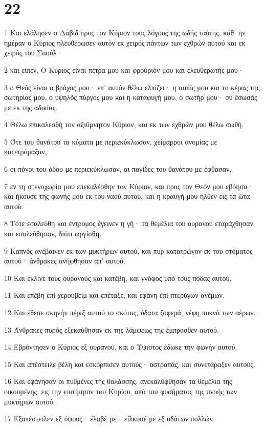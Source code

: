 \chapter{22}

\par 1 Και ελάλησεν ο Δαβίδ προς τον Κύριον τους λόγους της ωδής ταύτης, καθ' ην ημέραν ο Κύριος ηλευθέρωσεν αυτόν εκ χειρός πάντων των εχθρών αυτού και εκ χειρός του Σαούλ·
\par 2 και είπεν, Ο Κύριος είναι πέτρα μου και φρούριόν μου και ελευθερωτής μου·
\par 3 ο Θεός είναι ο βράχος μου· επ' αυτόν θέλω ελπίζει· η ασπίς μου και το κέρας της σωτηρίας μου, ο υψηλός πύργος μου και η καταφυγή μου, ο σωτήρ μου· συ έσωσάς με εκ της αδικίας.
\par 4 Θέλω επικαλεσθή τον αξιΰμνητον Κύριον, και εκ των εχθρών μου θέλω σωθή.
\par 5 Ότε του θανάτου τα κύματα με περιεκύκλωσαν, χείμαρροι ανομίας με κατετρόμαξαν,
\par 6 οι πόνοι του άδου με περιεκύκλωσαν, αι παγίδες του θανάτου με έφθασαν,
\par 7 εν τη στενοχωρία μου επεκαλέσθην τον Κύριον, και προς τον Θεόν μου εβόησα· και ήκουσε της φωνής μου εκ του ναού αυτού, και η κραυγή μου ήλθεν εις τα ώτα αυτού.
\par 8 Τότε εσαλεύθη και έντρομος έγεινεν η γή· τα θεμέλια του ουρανού εταράχθησαν και εσαλεύθησαν, διότι ωργίσθη.
\par 9 Καπνός ανέβαινεν εκ των μυκτήρων αυτού, και πυρ κατατρώγον εκ του στόματος αυτού· άνθρακες ανήφθησαν απ' αυτού.
\par 10 Και έκλινε τους ουρανούς και κατέβη, και γνόφος υπό τους πόδας αυτού.
\par 11 Και επέβη επί χερουβείμ και επέταξε, και εφάνη επί πτερύγων ανέμων.
\par 12 Και έθεσε σκηνήν πέριξ αυτού το σκότος, ύδατα ζοφερά, νέφη πυκνά των αέρων.
\par 13 Άνθρακες πυρός εξεκαύθησαν εκ της λάμψεως της έμπροσθεν αυτού.
\par 14 Εβρόντησεν ο Κύριος εξ ουρανού, και ο Ύψιστος έδωκε την φωνήν αυτού.
\par 15 Και απέστειλε βέλη και εσκόρπισεν αυτούς· αστραπάς, και συνετάραξεν αυτούς.
\par 16 Και εφάνησαν οι πυθμένες της θαλάσσης, ανεκαλύφθησαν τα θεμέλια της οικουμένης, εις την επιτίμησιν του Κυρίου, από του φυσήματος της πνοής των μυκτήρων αυτού.
\par 17 Εξαπέστειλεν εξ ύψους· έλαβέ με· είλκυσέ με εξ υδάτων πολλών.

